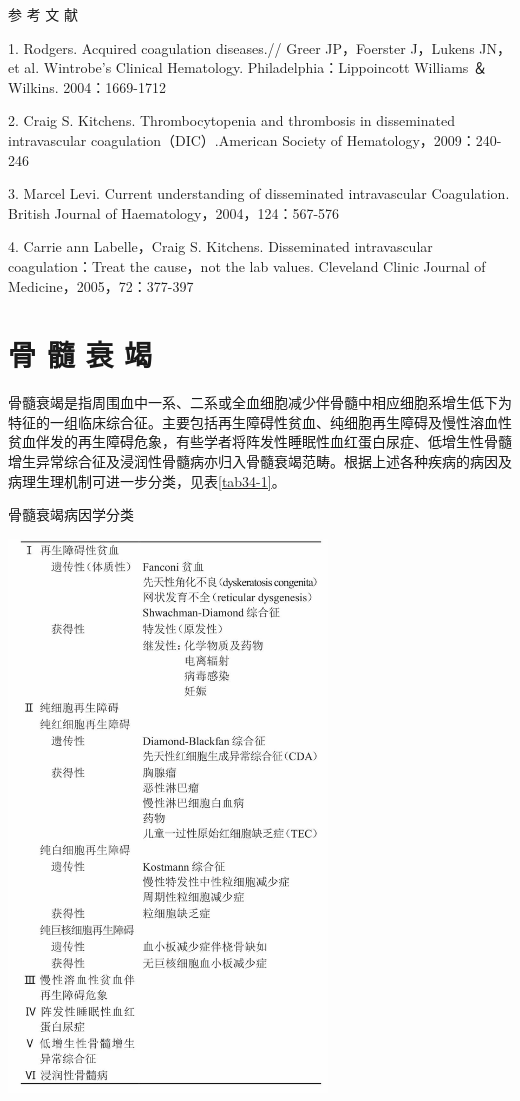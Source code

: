 \hypertarget{text00088.htmlux5cux23CHP3-9-4}{}
参 考 文 献

1. Rodgers. Acquired coagulation diseases.// Greer JP，Foerster
J，Lukens JN，et al. Wintrobe's Clinical Hematology.
Philadelphia：Lippoincott Williams ＆ Wilkins. 2004：1669-1712

2. Craig S. Kitchens. Thrombocytopenia and thrombosis in disseminated
intravascular coagulation（DIC）.American Society of
Hematology，2009：240-246

3. Marcel Levi. Current understanding of disseminated intravascular
Coagulation. British Journal of Haematology，2004，124：567-576

4. Carrie ann Labelle，Craig S. Kitchens. Disseminated intravascular
coagulation：Treat the cause，not the lab values. Cleveland Clinic
Journal of Medicine，2005，72：377-397

\protect\hypertarget{text00089.html}{}{}

\chapter{骨 髓 衰 竭}

骨髓衰竭是指周围血中一系、二系或全血细胞减少伴骨髓中相应细胞系增生低下为特征的一组临床综合征。主要包括再生障碍性贫血、纯细胞再生障碍及慢性溶血性贫血伴发的再生障碍危象，有些学者将阵发性睡眠性血红蛋白尿症、低增生性骨髓增生异常综合征及浸润性骨髓病亦归入骨髓衰竭范畴。根据上述各种疾病的病因及病理生理机制可进一步分类，见表\ref{tab34-1}。

\begin{table}[htbp]
\centering
\caption{骨髓衰竭病因学分类}
\label{tab34-1}
\includegraphics[width=3.33333in,height=5.77083in]{./images/Image00123.jpg}
\end{table}

